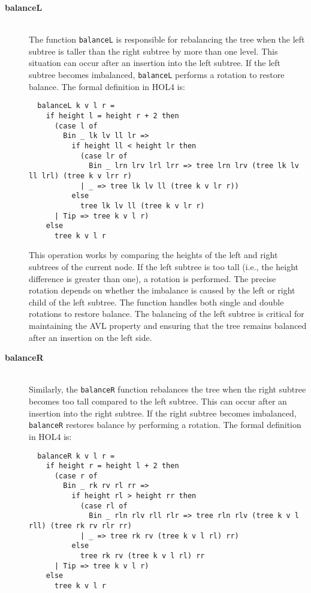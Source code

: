 \documentclass[12pt]{article}
\begin{document}
\begin{description}

  \item[\textbf{balanceL}] \\
  The function \texttt{balanceL} is responsible for rebalancing the tree when the left subtree is taller than the right subtree by more than one level. This situation can occur after an insertion into the left subtree. If the left subtree becomes imbalanced, \texttt{balanceL} performs a rotation to restore balance. The formal definition in HOL4 is:
  \begin{verbatim}
  balanceL k v l r =
    if height l = height r + 2 then
      (case l of
        Bin _ lk lv ll lr =>
          if height ll < height lr then
            (case lr of
              Bin _ lrn lrv lrl lrr => tree lrn lrv (tree lk lv ll lrl) (tree k v lrr r)
            | _ => tree lk lv ll (tree k v lr r))
          else
            tree lk lv ll (tree k v lr r)
      | Tip => tree k v l r)
    else
      tree k v l r
  \end{verbatim}
  
  This operation works by comparing the heights of the left and right subtrees of the current node. If the left subtree is too tall (i.e., the height difference is greater than one), a rotation is performed. The precise rotation depends on whether the imbalance is caused by the left or right child of the left subtree. The function handles both single and double rotations to restore balance. The balancing of the left subtree is critical for maintaining the AVL property and ensuring that the tree remains balanced after an insertion on the left side.

  \item[\textbf{balanceR}] \\
  Similarly, the \texttt{balanceR} function rebalances the tree when the right subtree becomes too tall compared to the left subtree. This can occur after an insertion into the right subtree. If the right subtree becomes imbalanced, \texttt{balanceR} restores balance by performing a rotation. The formal definition in HOL4 is:
  \begin{verbatim}
  balanceR k v l r =
    if height r = height l + 2 then
      (case r of
        Bin _ rk rv rl rr =>
          if height rl > height rr then
            (case rl of
              Bin _ rln rlv rll rlr => tree rln rlv (tree k v l rll) (tree rk rv rlr rr)
            | _ => tree rk rv (tree k v l rl) rr)
          else
            tree rk rv (tree k v l rl) rr
      | Tip => tree k v l r)
    else
      tree k v l r
  \end{verbatim}
  

\end{description}
\end{document}
